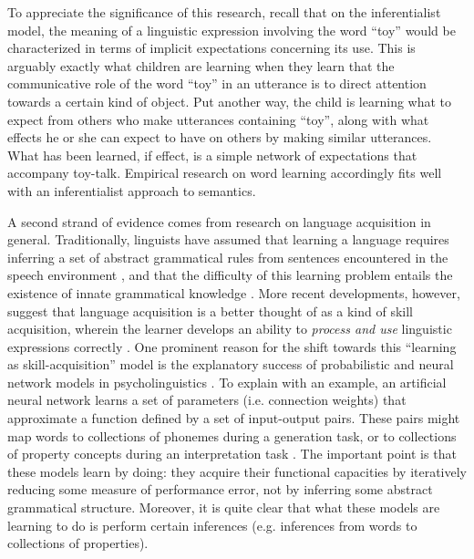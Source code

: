 To appreciate the significance of this research, recall that on the inferentialist model, the meaning of a linguistic expression involving the word ``toy'' would be characterized in terms of implicit expectations concerning its use. This is arguably exactly what children are learning when they learn that the communicative role of the word ``toy'' in an utterance is to direct attention towards a certain kind of object. Put another way, the child is learning what to expect from others who make utterances containing ``toy'', along with what effects he or she can expect to have on others by making similar utterances. What has been learned, if effect, is a simple network of expectations that accompany toy-talk. Empirical research on word learning accordingly fits well with an inferentialist approach to semantics. 

A second strand of evidence comes from research on language acquisition in general. Traditionally, linguists have assumed that learning a language requires inferring a set of abstract grammatical rules from sentences encountered in the speech environment \citep{Harley:2014,Pinker:1994,Seidenberg:1997}, and that the difficulty of this learning problem entails the existence of innate grammatical knowledge \citep{Harley:2014,Seidenberg:1997}. More recent developments, however, suggest that language acquisition is a better thought of as a kind of skill acquisition, wherein the learner develops an ability to \textit{process and use} linguistic expressions correctly \citep{Christiansen:2015,Seidenberg:1997}. One prominent reason for the shift towards this ``learning as skill-acquisition'' model is the explanatory success of probabilistic and neural network models in psycholinguistics \citep{Seidenberg:1997}. To explain with an example, an artificial neural network learns a set of parameters (i.e. connection weights) that approximate a function defined by a set of input-output pairs. These pairs might map words to collections of phonemes during a generation task, or to collections of property concepts during an interpretation task \citep[see, e.g.][]{McClelland:2010}. The important point is that these models learn by doing: they acquire their functional capacities by iteratively reducing some measure of performance error, not by inferring some abstract grammatical structure. Moreover, it is quite clear that what these models are learning to do is perform certain inferences (e.g. inferences from words to collections of properties). 

